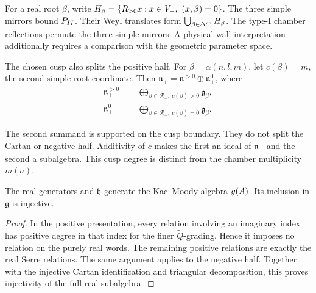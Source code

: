 For a real root $\beta$, write
$\Hpl_\beta=\{\R_{>0}x:x\in V_+,\ (x,\beta)=0\}$.
The three simple mirrors bound $P_{II}$. Their Weyl translates
form $\bigcup_{\beta\in\Delta^{re}}H_\beta$.
The type-I chamber reflections permute the three simple mirrors.
A physical wall interpretation additionally requires a comparison
with the geometric parameter space.

The chosen cusp also splits the positive half. For
$\beta=\alpha(n,l,m)$, let $c(\beta)=m$, the second simple-root
coordinate. Then $\mathfrak n_+=\mathfrak n_+^{>0}\oplus\mathfrak n_+^0$,
where
\begin{align*}
 \mathfrak n_+^{>0}&=\bigoplus_{\beta\in\mathcal R_+,\ c(\beta)>0}
                      \mathfrak g_\beta,\\
 \mathfrak n_+^0&=\bigoplus_{\beta\in\mathcal R_+,\ c(\beta)=0}
                      \mathfrak g_\beta.
\end{align*}

The second summand is supported on the cusp boundary.
They do not split the Cartan or negative half.
Additivity of $c$ makes the first an ideal of $\mathfrak n_+$
and the second a subalgebra. This cusp degree is distinct from
the chamber multiplicity $m(a)$.

\begin{lemma}
\label{lem:bkm-real-sub-km}
The real generators and $\mathfrak h$ generate the Kac--Moody
algebra $g(A)$. Its inclusion in $\mathfrak g$ is injective.
\end{lemma}
\begin{proof}
In the positive presentation, every relation involving an imaginary
index has positive degree in that index for the finer
$\widetilde Q$-grading. Hence it imposes no relation on the purely
real words. The remaining positive relations are exactly the real
Serre relations. The same argument applies to the negative half.
Together with the injective Cartan identification and triangular
decomposition, this proves injectivity of the full real subalgebra.
\end{proof}

